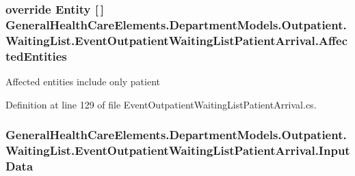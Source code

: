 \subsubsection[{\texorpdfstring{Affected\+Entities}{AffectedEntities}}]{\setlength{\rightskip}{0pt plus 5cm}override {\bf Entity} \mbox{[}$\,$\mbox{]} General\+Health\+Care\+Elements.\+Department\+Models.\+Outpatient.\+Waiting\+List.\+Event\+Outpatient\+Waiting\+List\+Patient\+Arrival.\+Affected\+Entities\hspace{0.3cm}{\ttfamily [get]}}\hypertarget{class_general_health_care_elements_1_1_department_models_1_1_outpatient_1_1_waiting_list_1_1_eveb69cba3dbb99690008a282b7e42002d2_a7c9a670d2c69bb4866dcbbcb17aca10e}{}\label{class_general_health_care_elements_1_1_department_models_1_1_outpatient_1_1_waiting_list_1_1_eveb69cba3dbb99690008a282b7e42002d2_a7c9a670d2c69bb4866dcbbcb17aca10e}


Affected entities include only patient 



Definition at line 129 of file Event\+Outpatient\+Waiting\+List\+Patient\+Arrival.\+cs.

\subsubsection[{\texorpdfstring{Input\+Data}{InputData}}]{ General\+Health\+Care\+Elements.\+Department\+Models.\+Outpatient.\+Waiting\+List.\+Event\+Outpatient\+Waiting\+List\+Patient\+Arrival.\+Input\+Data\hspace{0.3cm}{\ttfamily [get]}}\hypertarget{class_general_health_care_elements_1_1_department_models_1_1_outpatient_1_1_waiting_list_1_1_eveb69cba3dbb99690008a282b7e42002d2_aed5c55e5b80923b84d7225148c967d7b}{}\label{class_general_health_care_elements_1_1_department_models_1_1_outpatient_1_1_waiting_list_1_1_eveb69cba3dbb99690008a282b7e42002d2_aed5c55e5b80923b84d7225148c967d7b}


